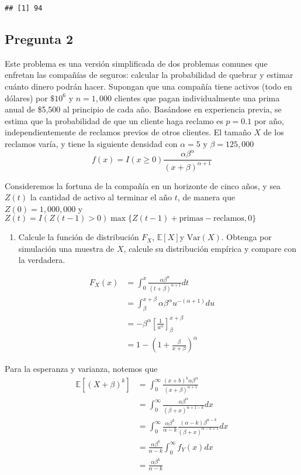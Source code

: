 \documentclass[]{article}
\providecommand{\tightlist}{%
  \setlength{\itemsep}{0pt}\setlength{\parskip}{0pt}}
\begin{document}
\begin{verbatim}
## [1] 94
\end{verbatim}

\hypertarget{pregunta-2}{%
\subsection{Pregunta 2}\label{pregunta-2}}

Este problema es una versión simplificada de dos problemas comunes que
enfretan las compañías de seguros: calcular la probabilidad de quebrar y
estimar cuánto dinero podrán hacer. Supongan que una compañía tiene
activos (todo en dólares) por \(\$10^6\) y \(n=1,000\) clientes que
pagan individualmente una prima anual de \$5,500 al principio de cada
año. Basándose en experiencia previa, se estima que la probabilidad de
que un cliente haga reclamo es \(p=0.1\) por año, independientemente de
reclamos previos de otros clientes. El tamaño \(X\) de los reclamos
varía, y tiene la siguiente densidad con \(\alpha = 5\) y
\(\beta = 125,000\) \[
f(x) = I(x\geq0)\frac{\alpha \beta^\alpha}{(x+\beta)^{\alpha+1}}
\]

Consideremos la fortuna de la compañía en un horizonte de cinco años, y
sea \(Z(t)\) la cantidad de activo al terminar el año \(t\), de manera
que \(Z(0)=1,000,000\) y
\(Z(t)=I(Z(t-1)>0)\max\{Z(t-1)+\textrm{primas}-\textrm{reclamos},0\}\)

\begin{enumerate}
\def\labelenumi{\alph{enumi}.}
\tightlist
\item
  Calcule la función de distribución \(F_X\), \(\mathbb{E}[X]\)y
  \(\textrm{Var}(X)\). Obtenga por simulación una muestra de \(X\),
  calcule su distribución empírica y compare con la verdadera.
\end{enumerate}

\[
\begin{align}
F_X(x) &= \int_0^x \frac{\alpha \beta^\alpha}{(t+\beta)^{\alpha+1}}dt \\
&= \int_\beta^{x+\beta}\alpha \beta^\alpha u^{-(\alpha+1)} du\\
&= -\beta^\alpha \left[ \frac{1}{u^\alpha} \right]^{x+\beta}_\beta \\ 
&= 1 - \left(1+\frac{\beta}{x+\beta} \right)^\alpha
\end{align}
\]

Para la esperanza y varianza, notemos que \[
\begin{align}
\mathbb{E}[(X + \beta)^k] &= \int_0^\infty\frac{(x+b)^k\alpha\beta^\alpha}{(x+\beta)^{\alpha+1}} \\
&= \int_0^\infty \frac{\alpha \beta^\alpha}{(\beta+x)^{\alpha + 1 - k}} dx \\
&= \int_0^\infty\frac{\alpha \beta^k}{\alpha-k} \frac{(\alpha-k) \beta^{\alpha-k}}{(\beta+x)^{\alpha-k+1}} dx \\
&= \frac{\alpha \beta^k}{\alpha-k} \int_0^\infty f_Y(x) dx \\
&=\frac{\alpha \beta^k}{\alpha-k}
\end{align}
\]
\end{document}
